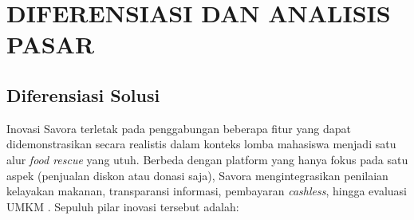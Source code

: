 \section{DIFERENSIASI DAN ANALISIS PASAR}

\subsection{Diferensiasi Solusi}

Inovasi Savora terletak pada penggabungan beberapa fitur yang dapat didemonstrasikan secara
realistis dalam konteks lomba mahasiswa menjadi satu alur \textit{food rescue} yang utuh. Berbeda
dengan platform yang hanya fokus pada satu aspek (penjualan diskon atau donasi saja), Savora
mengintegrasikan penilaian kelayakan makanan, transparansi informasi, pembayaran \textit{cashless},
hingga evaluasi UMKM \cite{kusumawati2025mobile}\cite{mobilefoodwaste2024review}. Sepuluh pilar
inovasi tersebut adalah:

